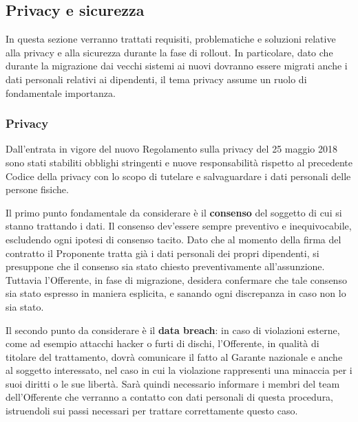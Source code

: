                     
		\subsection{Privacy e sicurezza}
                    In questa sezione verranno trattati requisiti, problematiche e soluzioni relative alla privacy e alla sicurezza durante la fase di rollout. In particolare, dato che durante la migrazione dai vecchi sistemi ai nuovi dovranno essere migrati anche i dati personali relativi ai dipendenti, il tema privacy assume un ruolo di fondamentale importanza.
                    
                    \subsubsection{Privacy}
                    
                    Dall'entrata in vigore del nuovo Regolamento sulla privacy del 25 maggio 2018 sono stati stabiliti obblighi stringenti e nuove responsabilità rispetto al precedente Codice della privacy con lo scopo di tutelare e salvaguardare i dati personali delle persone fisiche.
                
                
                	Il primo punto fondamentale da considerare è il \textbf{consenso} del soggetto di cui si stanno trattando i dati. Il consenso dev'essere sempre preventivo e inequivocabile, escludendo ogni ipotesi di consenso tacito. Dato che al momento della firma del contratto il Proponente tratta già i dati personali dei propri dipendenti, si presuppone che il consenso sia stato chiesto preventivamente all'assunzione. Tuttavia l'Offerente, in fase di migrazione, desidera confermare che tale consenso sia stato espresso in maniera esplicita, e sanando ogni discrepanza in caso non lo sia stato.
                    
                    
                    Il secondo punto da considerare è il \textbf{data breach}: in caso di violazioni esterne, come ad esempio attacchi hacker o furti di dischi, l'Offerente, in qualità di titolare del trattamento, dovrà comunicare il fatto al Garante nazionale e anche al soggetto interessato, nel caso in cui la violazione rappresenti una minaccia per i suoi diritti o le sue libertà. Sarà quindi necessario informare i membri del team dell'Offerente che verranno a contatto con dati personali di questa procedura, istruendoli sui passi necessari per trattare correttamente questo caso.
                    
